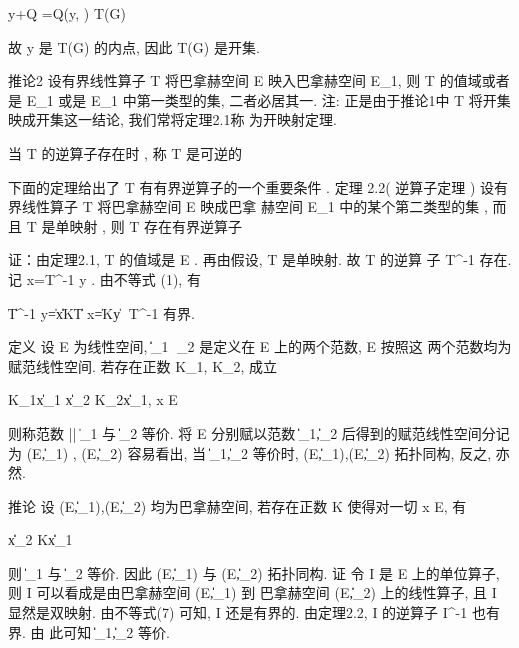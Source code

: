 y+Q =Q\left(y, \right) \subset T(G)

故  y  是  T(G)  的内点, 因此  T(G)  是开集.



推论2  \quad  设有界线性算子  T  将巴拿赫空间  E  映入巴拿赫空间  E_{1},  则  T  的值域或者是  E_{1}  或是  E_{1}  中第一类型的集, 二者必居其一.
注: 正是由于推论1中  T  将开集映成开集这一结论, 我们常将定理2.1称
为开映射定理.

 


当 T 的逆算子存在时 , 称 T 是可逆的

下面的定理给出了 T 有有界逆算子的一个重要条件 .
定理 2.2( 逆算子定理 ) 设有界线性算子 T 将巴拿赫空间 E 映成巴拿
赫空间 E_1 中的某个第二类型的集 , 而且 T 是单映射 , 则 T 存在有界逆算子 


证：由定理2.1,  T  的值域是  E .  再由假设,  T  是单映射. 故  T  的逆算
子  T^{-1}  存在.
记  x=T^{-1} y .  由不等式  (1),  有

\left\|T^{-1} y\right\|=\|x\| \leq K\|T x\|=K\|y\|

故  T^{-1}  有界.



定义 设  E  为线性空间,  \|\cdot\|_{1} 、\|\cdot\|_{2}  是定义在  E  上的两个范数,  E  按照这 两个范数均为赋范线性空间.
若存在正数  K_{1}, K_{2},  成立

K_{1}\|x\|_{1} \leq\|x\|_{2} \leq K_{2}\|x\|_{1}, \forall x \in E

则称范数 ||  \cdot \|_{1}  与  \|\cdot\|_{2}  等价.
将  E  分别赋以范数  \|\cdot\|_{1},\|\cdot\|_{2}  后得到的赋范线性空间分记为  \left(E,\|\cdot\|_{1}\right) ,  \left(E,\|\cdot\|_{2}\right) 
容易看出, 当  \|\cdot\|_{1},\|\cdot\|_{2}  等价时,  \left(E,\|\cdot\|_{1}\right),\left(E,\|\cdot\|_{2}\right)  拓扑同构, 反之, 亦
然.



推论  \quad  设  \left(E,\|\cdot\|_{1}\right),\left(E,\|\cdot\|_{2}\right)  均为巴拿赫空间,
若存在正数  K  使得对一切  x \in E,  有

\|x\|_{2} \leq K\|x\|_{1}

则  \|\cdot\|_{1}  与  \|\cdot\|_{2}  等价. 因此  \left(E,\|\cdot\|_{1}\right)  与  \left(E,\|\cdot\|_{2}\right)  拓扑同构.
证  \quad  令  I  是  E  上的单位算子, 则  I  可以看成是由巴拿赫空间  \left(E,\|\cdot\|_{1}\right)  到 巴拿赫空间  \left(E,\|\cdot\|_{2}\right)  上的线性算子, 且  I  显然是双映射.
由不等式(7) 可知,  I  还是有界的. 由定理2.2,  I  的逆算子  I^{-1}  也有界. 由
此可知  \|\cdot\|_{1},\|\cdot\|_{2}  等价.

